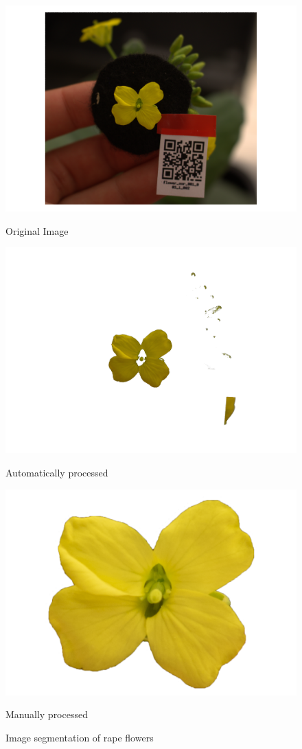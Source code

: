 \documentclass[11pt,a4paper]{article}
\begin{document}
\begin{spacing}{1.5}
\begin{figure}
	\centering
	\begin{minipage}{0.3\linewidth}
		\centering
		\includegraphics[width=0.9\linewidth]{origin}
		\caption{Original Image}
		\label{origin}
	\end{minipage}
	\centering
	\begin{minipage}{0.3\linewidth}
		\centering
		\includegraphics[width=1.2\linewidth]{automatic}
		\caption{Automatically processed}
		\label{automatic}
	\end{minipage}
	\centering
	\begin{minipage}{0.3\linewidth}
		\centering
		\includegraphics[width=0.6\linewidth]{hand}
		\caption{Manually processed}
		\label{manual}
	\end{minipage}
	\caption{Image segmentation of rape flowers}
	\label{fig:image-segmentation-of-rape-flowers}
\end{figure}



\end{spacing}
\end{document}

